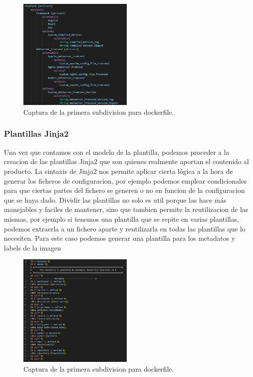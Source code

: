 \documentclass[12pt, a4paper, twoside]{article}
\begin{document}
\begin{figure}[ht]
	\centering
	  \includegraphics[width=0.5\textwidth]{dockerfile.frontend.png}
	\caption{Captura de la primera subdivision para dockerfile.}
\end{figure}

\subsubsection{Plantillas Jinja2}
Una vez que contamos con el modelo de la plantilla, podemos proceder a la creacion de las plantillas Jinja2 que son quienes realmente aportan el contenido al producto.
La sintaxis de Jinja2 nos permite aplicar cierta lógica a la hora de generar los ficheros de configuracion, por ejemplo podemos emplear condicionales para que ciertas partes del fichero se generen o no en funcion de la configuracion que se haya dado.
Dividir las plantillas no solo es util porque las hace más manejables y faciles de mantener, sino que tambien permite la reutilizacion de las mismas, por ejemplo si tenemos una plantilla que se repite en varias plantillas, podemos extraerla a un fichero aparte y reutilizarla en todas las plantillas que lo necesiten.
Para este caso podemos generar una plantilla para los metadatos y labels de la imagen 

\begin{figure}[ht]
	\centering
	  \includegraphics[width=0.5\textwidth]{dockerfile.metadata.png}
	\caption{Captura de la primera subdivision para dockerfile.}
\end{figure}
\end{document}
